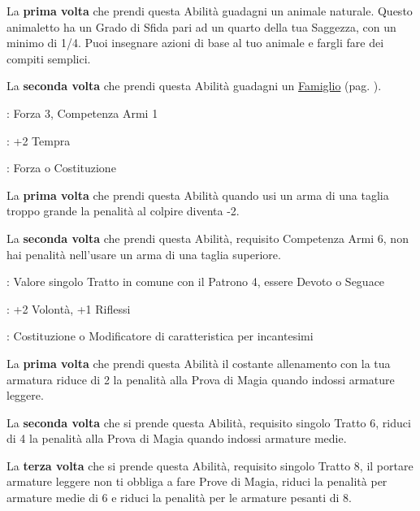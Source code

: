 \begin{multicols}{2}
La \textbf{prima volta} che prendi questa Abilità guadagni un animale naturale. Questo animaletto ha un Grado di Sfida pari ad un quarto della tua Saggezza, con un minimo di 1/4. Puoi insegnare azioni di base al tuo animale e fargli fare dei compiti semplici.

La \textbf{seconda volta} che prendi questa Abilità guadagni un \hyperlink{famiglio}{Famiglio} (pag. \pageref{famiglio}).

\begin{description}[noitemsep, topsep=0pt, parsep=0pt, partopsep=0pt, leftmargin=0cm, labelwidth=2.5cm]
    \item[\textbf{Requisito}]: Forza 3, Competenza Armi 1
    \item[\textbf{Tiri Salvezza}]: +2 Tempra
    \item[\textbf{Caratteristica}]: Forza o Costituzione
\end{description}

La \textbf{prima volta} che prendi questa Abilità quando usi un arma di una taglia troppo grande la penalità al colpire diventa -2.

La \textbf{seconda volta} che prendi questa Abilità, requisito Competenza Armi 6, non hai penalità nell'usare un arma di una taglia superiore.

\begin{description}[noitemsep, topsep=0pt, parsep=0pt, partopsep=0pt, leftmargin=0cm, labelwidth=2.5cm]
    \item[\textbf{Requisito}]: Valore singolo Tratto in comune con il Patrono 4, essere Devoto o Seguace
    \item[\textbf{Tiri Salvezza}]: +2 Volontà, +1 Riflessi
    \item[\textbf{Caratteristica}]: Costituzione o Modificatore di caratteristica per incantesimi
\end{description}

La \textbf{prima volta} che prendi questa Abilità il costante allenamento con la tua armatura riduce di 2 la penalità alla Prova di Magia quando indossi armature leggere.

La \textbf{seconda volta} che si prende questa Abilità, requisito singolo Tratto 6, riduci di 4 la penalità alla Prova di Magia quando indossi armature medie.

La \textbf{terza volta} che si prende questa Abilità, requisito singolo Tratto 8, il portare armature leggere non ti obbliga a fare Prove di Magia, riduci la penalità per armature medie di 6 e riduci la penalità per le armature pesanti di 8.


\end{multicols}
